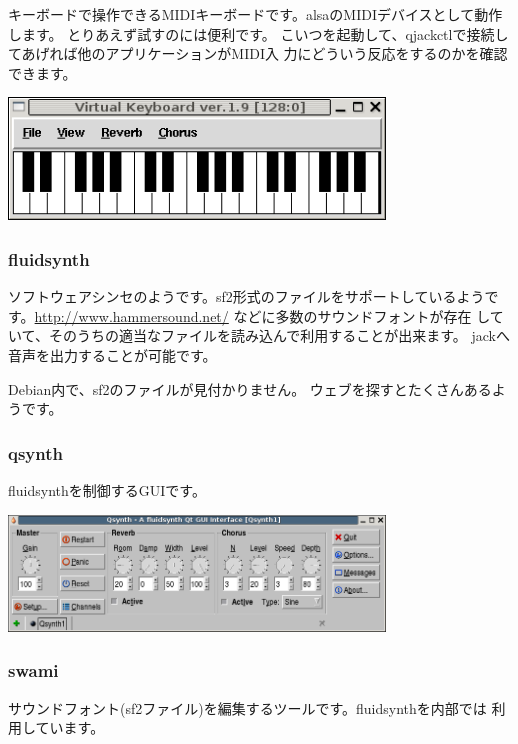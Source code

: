\documentclass[mingoth,a4paper]{jsarticle}
\begin{document}
キーボードで操作できるMIDIキーボードです。alsaのMIDIデバイスとして動作します。
とりあえず試すのには便利です。
こいつを起動して、qjackctlで接続してあげれば他のアプリケーションがMIDI入
力にどういう反応をするのかを確認できます。

\includegraphics[width=10cm]{image200602/vkeybd.png}

\subsubsection{fluidsynth}

ソフトウェアシンセのようです。sf2形式のファイルをサポートしているようで
す。\url{http://www.hammersound.net/} などに多数のサウンドフォントが存在
していて、そのうちの適当なファイルを読み込んで利用することが出来ます。
jackへ音声を出力することが可能です。

Debian内で、sf2のファイルが見付かりません。
ウェブを探すとたくさんあるようです。

\subsubsection{qsynth}

fluidsynthを制御するGUIです。

\includegraphics[width=10cm]{image200602/qsynth.png}

\subsubsection{swami}

サウンドフォント(sf2ファイル)を編集するツールです。fluidsynthを内部では
利用しています。
\end{document}

